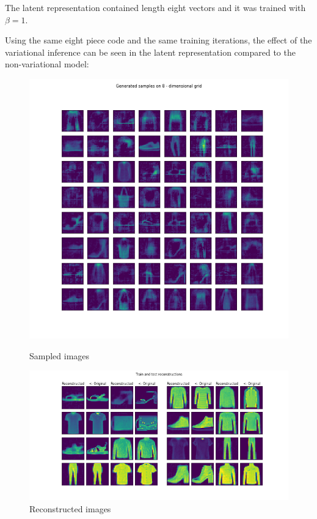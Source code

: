 \documentclass[12pt, english]{article}
\begin{document}
\vspace{4mm}

\par The latent representation contained length eight vectors and it was trained with $\beta = 1$.

\vspace{4mm}

\par Using the same eight piece code and the same training iterations, the effect of the variational inference can be seen in the latent representation compared to the non-variational model:

\begin{figure}[ht] 
  \label{fig:auto_encoder_results} 
  \begin{minipage}{0.5\linewidth}
    \centering
    \includegraphics[width=.65\linewidth]{gen/generated_samples_fashion_mnist_auto_encoder.png} 
    \caption{Sampled images} 
  \end{minipage}%
  \begin{minipage}{0.5\linewidth}
    \centering
    \includegraphics[width=.95\linewidth]{reco/reconstrunction_samples_fashion_mnist_auto_encoder.png} 
    \caption{Reconstructed images} 
  \end{minipage} 
\end{figure}
\end{document}
